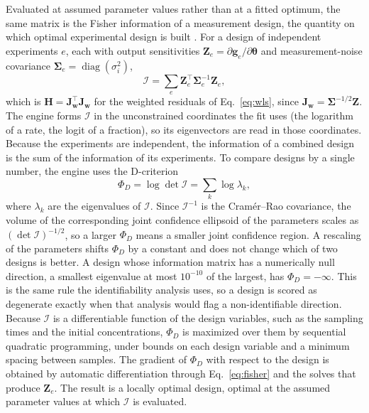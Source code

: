 \documentclass{article}
\begin{document}
Evaluated at assumed parameter values rather than at a fitted optimum, the same matrix is the Fisher information of a measurement design, the quantity on which optimal experimental design is built \citep{franceschini2008, vanrolleghem1995}. For a design of independent experiments \(e\), each with output sensitivities \(\mathbf{Z}_e=\partial\mathbf{g}_e/\partial\boldsymbol{\theta}\) and measurement-noise covariance \(\boldsymbol{\Sigma}_e=\operatorname{diag}(\sigma_i^2)\),
\begin{equation}
  \boldsymbol{\mathcal{I}}=\sum_e \mathbf{Z}_e^{\top}\boldsymbol{\Sigma}_e^{-1}\mathbf{Z}_e ,
  \label{eq:fisher}
\end{equation}
which is \(\mathbf{H}=\mathbf{J}_{\mathbf{w}}^{\top}\mathbf{J}_{\mathbf{w}}\) for the weighted residuals of Eq.~\eqref{eq:wls}, since \(\mathbf{J}_{\mathbf{w}}=\boldsymbol{\Sigma}^{-1/2}\mathbf{Z}\). The engine forms \(\boldsymbol{\mathcal{I}}\) in the unconstrained coordinates the fit uses (the logarithm of a rate, the logit of a fraction), so its eigenvectors are read in those coordinates. Because the experiments are independent, the information of a combined design is the sum of the information of its experiments. To compare designs by a single number, the engine uses the D-criterion
\begin{equation}
  \Phi_D=\log\det\boldsymbol{\mathcal{I}}=\sum_k\log\lambda_k ,
  \label{eq:dcrit}
\end{equation}
where \(\lambda_k\) are the eigenvalues of \(\boldsymbol{\mathcal{I}}\). Since \(\boldsymbol{\mathcal{I}}^{-1}\) is the Cram\'er--Rao covariance, the volume of the corresponding joint confidence ellipsoid of the parameters scales as \((\det\boldsymbol{\mathcal{I}})^{-1/2}\), so a larger \(\Phi_D\) means a smaller joint confidence region. A rescaling of the parameters shifts \(\Phi_D\) by a constant and does not change which of two designs is better. A design whose information matrix has a numerically null direction, a smallest eigenvalue at most \(10^{-10}\) of the largest, has \(\Phi_D=-\infty\). This is the same rule the identifiability analysis uses, so a design is scored as degenerate exactly when that analysis would flag a non-identifiable direction. Because \(\boldsymbol{\mathcal{I}}\) is a differentiable function of the design variables, such as the sampling times and the initial concentrations, \(\Phi_D\) is maximized over them by sequential quadratic programming, under bounds on each design variable and a minimum spacing between samples. The gradient of \(\Phi_D\) with respect to the design is obtained by automatic differentiation through Eq.~\eqref{eq:fisher} and the solves that produce \(\mathbf{Z}_e\). The result is a locally optimal design, optimal at the assumed parameter values at which \(\boldsymbol{\mathcal{I}}\) is evaluated.
\end{document}

